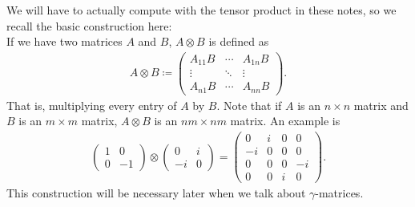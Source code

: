 \documentclass[11pt]{article}
\begin{document}
\begin{nnote}
    We will have to actually compute with the tensor product in these
    notes, so we recall the basic construction here:\\

    \noin
    If we have two matrices $A$ and $B$, $A \otimes B$
    is defined as
    \begin{align*}
        A \otimes B \coloneqq \begin{pmatrix}
            A_{11} B & \cdots & A_{1n} B\\
            \vdots & \ddots & \vdots\\
            A_{n1} B & \cdots & A_{nn} B
        \end{pmatrix}.
    \end{align*}
    That is, multiplying every entry of $A$ by $B$.
    Note that if $A$ is an $n \times n$ matrix and
    $B$ is an $m \times m$ matrix, $A \otimes B$
    is an $nm \times nm$ matrix.
    An example is
    \begin{align*}
        \begin{pmatrix}
            1 & 0\\
            0 & -1
        \end{pmatrix}
        \otimes
        \begin{pmatrix}
            0 & i\\
            -i & 0
        \end{pmatrix}
        = \begin{pmatrix}
            0 & i & 0 & 0\\
            -i & 0 & 0 & 0\\
            0 & 0 & 0 & -i\\
            0 & 0 & i & 0
        \end{pmatrix}.
    \end{align*}
    This construction will be necessary later when we talk about
    $\gamma$-matrices.
\end{nnote}
\end{document}
